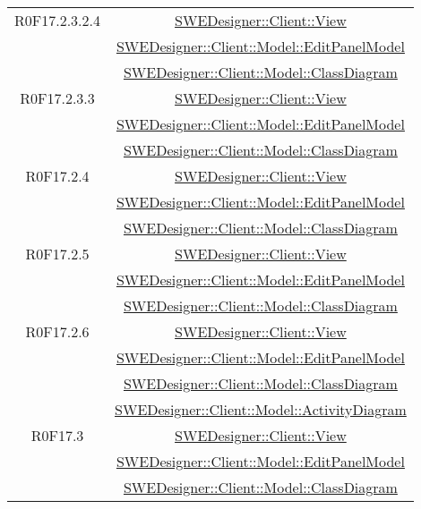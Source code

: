 \documentclass[../SpecificaTecnica.tex]{subfiles}
\begin{document}
\begin{longtable}{|c|c|}
		R0F17.2.3.2.4 & \hyperlink{SWEDesigner::Client::View}{SWEDesigner::Client::View} \\& \hyperlink{SWEDesigner::Client::Model::EditPanelModel}{SWEDesigner::Client::Model::EditPanelModel} \\& \hyperlink{SWEDesigner::Client::Model::ClassDiagram}{SWEDesigner::Client::Model::ClassDiagram}\\\hline
		R0F17.2.3.3 & \hyperlink{SWEDesigner::Client::View}{SWEDesigner::Client::View} \\& \hyperlink{SWEDesigner::Client::Model::EditPanelModel}{SWEDesigner::Client::Model::EditPanelModel} \\& \hyperlink{SWEDesigner::Client::Model::ClassDiagram}{SWEDesigner::Client::Model::ClassDiagram}\\\hline
		R0F17.2.4 & \hyperlink{SWEDesigner::Client::View}{SWEDesigner::Client::View} \\& \hyperlink{SWEDesigner::Client::Model::EditPanelModel}{SWEDesigner::Client::Model::EditPanelModel} \\& \hyperlink{SWEDesigner::Client::Model::ClassDiagram}{SWEDesigner::Client::Model::ClassDiagram}\\\hline
		R0F17.2.5 & \hyperlink{SWEDesigner::Client::View}{SWEDesigner::Client::View} \\& \hyperlink{SWEDesigner::Client::Model::EditPanelModel}{SWEDesigner::Client::Model::EditPanelModel} \\& \hyperlink{SWEDesigner::Client::Model::ClassDiagram}{SWEDesigner::Client::Model::ClassDiagram}\\\hline
		R0F17.2.6 & \hyperlink{SWEDesigner::Client::View}{SWEDesigner::Client::View} \\& \hyperlink{SWEDesigner::Client::Model::EditPanelModel}{SWEDesigner::Client::Model::EditPanelModel} \\& \hyperlink{SWEDesigner::Client::Model::ClassDiagram}{SWEDesigner::Client::Model::ClassDiagram} \\& \hyperlink{SWEDesigner::Client::Model::ActivityDiagram}{SWEDesigner::Client::Model::ActivityDiagram}\\\hline
		R0F17.3 & \hyperlink{SWEDesigner::Client::View}{SWEDesigner::Client::View} \\& \hyperlink{SWEDesigner::Client::Model::EditPanelModel}{SWEDesigner::Client::Model::EditPanelModel} \\& \hyperlink{SWEDesigner::Client::Model::ClassDiagram}{SWEDesigner::Client::Model::ClassDiagram} \\\hline

\end{longtable}
\end{document}
